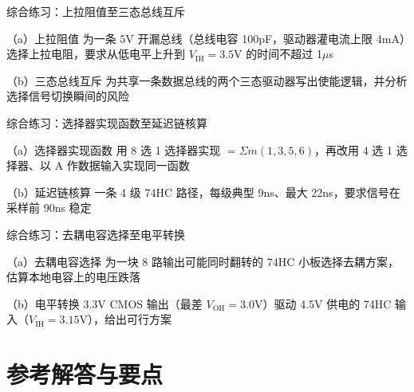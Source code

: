 \begin{chapterexercise}{综合练习：上拉阻值至三态总线互斥}
\begin{exercisesubproblem}{（a）上拉阻值}
为一条 5V 开漏总线（总线电容 100pF，驱动器灌电流上限 4mA）选择上拉电阻，要求从低电平上升到 $V_\mathrm{IH}=3.5$V 的时间不超过 1$\mu$s
\end{exercisesubproblem}
\begin{exercisesubproblem}{（b）三态总线互斥}
为共享一条数据总线的两个三态驱动器写出使能逻辑，并分析选择信号切换瞬间的风险
\end{exercisesubproblem}
\end{chapterexercise}

\begin{chapterexercise}{综合练习：选择器实现函数至延迟链核算}
\begin{exercisesubproblem}{（a）选择器实现函数}
用 8 选 1 选择器实现 $=\Sigma m(1,3,5,6)$，再改用 4 选 1 选择器、以 A 作数据输入实现同一函数
\end{exercisesubproblem}
\begin{exercisesubproblem}{（b）延迟链核算}
一条 4 级 74HC 路径，每级典型 9ns、最大 22ns，要求信号在采样前 90ns 稳定
\end{exercisesubproblem}
\end{chapterexercise}

\begin{chapterexercise}{综合练习：去耦电容选择至电平转换}
\begin{exercisesubproblem}{（a）去耦电容选择}
为一块 8 路输出可能同时翻转的 74HC 小板选择去耦方案，估算本地电容上的电压跌落
\end{exercisesubproblem}
\begin{exercisesubproblem}{（b）电平转换}
3.3V CMOS 输出（最差 $V_\mathrm{OH}=3.0$V）驱动 4.5V 供电的 74HC 输入（$V_\mathrm{IH}=3.15$V），给出可行方案
\end{exercisesubproblem}
\end{chapterexercise}

\section*{参考解答与要点}

